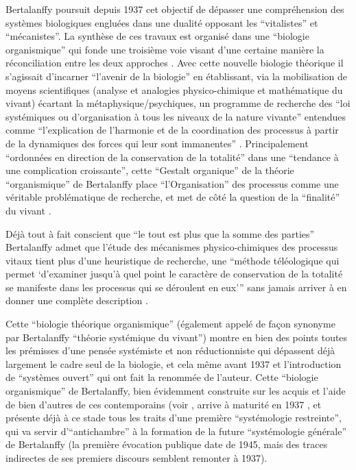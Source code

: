 Bertalanffy poursuit depuis 1937 cet objectif de dépasser une compréhension des systèmes biologiques engluées dans une dualité opposant les \enquote{vitalistes} et \enquote{mécanistes}. La synthèse de ces travaux est organisé dans une \enquote{biologie organismique} qui fonde une troisième voie visant d'une certaine manière la réconciliation entre les deux approches \autocites[55-56]{Lemoigne1977}[258]{Bertalanffy1961}. Avec cette nouvelle biologie théorique il s'agissait d'incarner \enquote{l'avenir de la biologie} en établissant, via la mobilisation de moyens scientifiques (analyse et analogies physico-chimique et mathématique du vivant) écartant la métaphysique/psychiques, un programme de recherche des \enquote{loi systémiques ou d'organisation à tous les niveaux de la nature vivante} entendues comme \enquote{l'explication de l'harmonie et de la coordination des processus à partir de la dynamiques des forces qui leur sont immanentes} \autocite[456]{Pouvreau2013}. Principalement \enquote{ordonnées en direction de la conservation de la totalité}\autocite[440-458]{Pouvreau2013} dans une \enquote{tendance à une complication croissante}, cette \enquote{Gestalt organique} de la théorie \enquote{organismique} de Bertalanffy place \enquote{l'Organisation} des processus comme une véritable problématique de recherche, et met de côté la question de la \enquote{finalité} du vivant \autocite[455-457]{Pouvreau2013}.

Déjà tout à fait conscient que \enquote{le tout est plus que la somme des parties} Bertalanffy admet que l'étude des mécanismes physico-chimiques des processus vitaux tient plus d'une heuristique de recherche, une \enquote{méthode téléologique qui permet \enquote{d'examiner jusqu’à quel point le caractère de conservation de la totalité se manifeste dans les processus qui se déroulent en eux}} sans jamais arriver à en donner une complète description \autocite[464]{Pouvreau2013}.

Cette \enquote{biologie théorique organismique} (également appelé de façon synonyme par Bertalanffy \enquote{théorie systémique du vivant}) montre en bien des points toutes les prémisses d'une pensée systémiste et non réductionniste qui dépassent déjà largement le cadre seul de la biologie, et cela même avant 1937 et l'introduction de \enquote{systèmes ouvert} \autocite[499]{Pouvreau2013} qui ont fait la renommée de l'auteur. Cette \enquote{biologie organismique} de Bertalanffy, bien évidemment construite sur les acquis et l'aide de bien d'autres de ces contemporains (voir \autocite{Pouvreau2013}, arrive à maturité en 1937 \autocite[14]{Pouvreau2013}, et présente déjà à ce stade tous les traits d'une première \enquote{systémologie restreinte}, qui va servir d'\enquote{antichambre} à la formation de la future \enquote{systémologie générale} \autocite[670]{Pouvreau2013} de Bertalanffy (la première évocation publique date de 1945, mais des traces indirectes de ses premiers discours semblent remonter à 1937).


